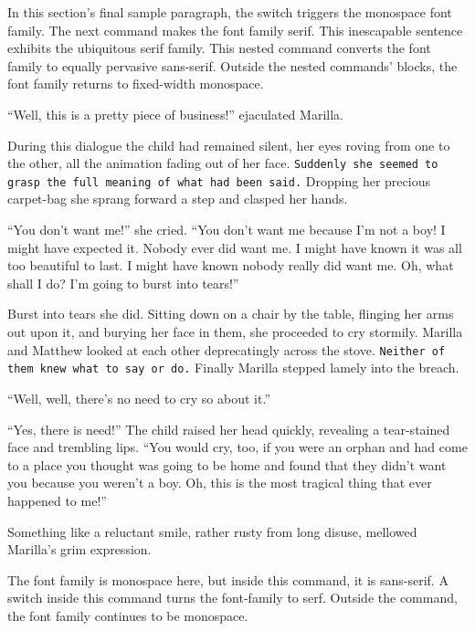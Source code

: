 \documentclass[a4paper]{article}
\begin{document}
In this section's final sample paragraph, \ttfamily the switch triggers the monospace font family. The next command makes the font family serif. \textrm{This inescapable sentence exhibits the ubiquitous serif family. \textsf{This nested command converts the font family to equally pervasive sans-serif.}} Outside the nested commands' blocks, the font family returns to fixed-width monospace.

\sffamily``Well, this is a pretty piece of business!'' ejaculated Marilla.

\textrm{During this dialogue the child had remained silent, her eyes roving from one to the other, all the animation fading out of her face. \texttt{Suddenly she seemed to grasp the full meaning of what had been said.} Dropping her precious carpet-bag she sprang forward a step and clasped her hands.}

``You don't want me!'' she cried. ``You don't want me because I'm not a boy! I might have expected it. Nobody ever did want me. I might have known it was all too beautiful to last. I might have known nobody really did want me. \rmfamily Oh, what shall I do? I'm going to burst into tears!''

Burst into tears she did. \textsf{Sitting down on a chair by the table, flinging her arms out upon it, and burying her face in them, she proceeded to cry stormily.} Marilla and Matthew looked at each other deprecatingly across the stove. \texttt{Neither of them knew what to say or do.} Finally Marilla stepped lamely into the breach.

``Well, well, there's no need to cry so about it.''

``Yes, there is need!'' \ttfamily The child raised her head quickly, revealing a tear-stained face and trembling lips. \textrm{``You would cry, too, if you were an orphan and had come to a place you thought was going to be home and found that they didn't want you because you weren't a boy. \textsf{Oh, this is the most tragical thing that ever happened to me!''}}

Something like a reluctant smile, rather rusty from long disuse, mellowed Marilla's grim expression.

The font family is monospace here, \textsf{but inside this command, it is sans-serif. \rmfamily A switch inside this command turns the font-family to serf.} Outside the command, the font family continues to be monospace.
\end{document}
